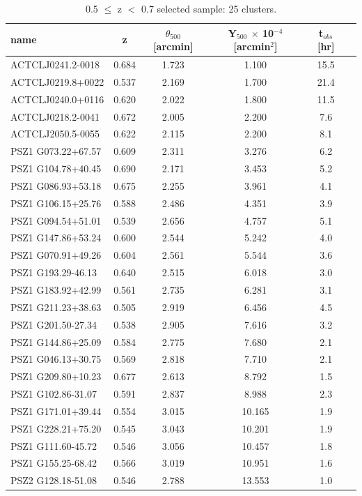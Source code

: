 \documentclass[11pt,a4paper,twoside,graphicx,color]{article}
\begin{document}
\begin{table}
\centering
\begin{tabular}{|l  || c  | c | c | c | c | }
  \hline                       
name  &   z  & $\theta_{500}$ [arcmin] & Y$_{500}$ $\times$ 10$^{-4}$ [arcmin$^{2}$] & t$_{obs}$ [hr] \\ \hline
   ACTCLJ0241.2-0018  & 0.684 & 1.723 & 1.100 & 15.5 \\ \hline
   ACTCLJ0219.8+0022  & 0.537 & 2.169 & 1.700 & 21.4 \\ \hline
   ACTCLJ0240.0+0116  & 0.620 & 2.022 & 1.800 & 11.5 \\ \hline
   ACTCLJ0218.2-0041  & 0.672 & 2.005 & 2.200 & 7.6 \\ \hline
   ACTCLJ2050.5-0055  & 0.622 & 2.115 & 2.200 & 8.1 \\ \hline
  PSZ1 G073.22+67.57  & 0.609 & 2.311 & 3.276 & 6.2 \\ \hline
  PSZ1 G104.78+40.45  & 0.690 & 2.171 & 3.453 & 5.2 \\ \hline
  PSZ1 G086.93+53.18  & 0.675 & 2.255 & 3.961 & 4.1 \\ \hline
  PSZ1 G106.15+25.76  & 0.588 & 2.486 & 4.351 & 3.9 \\ \hline
  PSZ1 G094.54+51.01  & 0.539 & 2.656 & 4.757 & 5.1 \\ \hline
  PSZ1 G147.86+53.24  & 0.600 & 2.544 & 5.242 & 4.0 \\ \hline
  PSZ1 G070.91+49.26  & 0.604 & 2.561 & 5.544 & 3.6 \\ \hline
  PSZ1 G193.29-46.13  & 0.640 & 2.515 & 6.018 & 3.0 \\ \hline
  PSZ1 G183.92+42.99  & 0.561 & 2.735 & 6.281 & 3.1 \\ \hline
  PSZ1 G211.23+38.63  & 0.505 & 2.919 & 6.456 & 4.5 \\ \hline
  PSZ1 G201.50-27.34  & 0.538 & 2.905 & 7.616 & 3.2 \\ \hline
  PSZ1 G144.86+25.09  & 0.584 & 2.775 & 7.680 & 2.1 \\ \hline
  PSZ1 G046.13+30.75  & 0.569 & 2.818 & 7.710 & 2.1 \\ \hline
  PSZ1 G209.80+10.23  & 0.677 & 2.613 & 8.792 & 1.5 \\ \hline
  PSZ1 G102.86-31.07  & 0.591 & 2.837 & 8.988 & 2.3 \\ \hline
  PSZ1 G171.01+39.44  & 0.554 & 3.015 & 10.165 & 1.9 \\ \hline 
  PSZ1 G228.21+75.20  & 0.545 & 3.043 & 10.201 & 1.9 \\ \hline
  PSZ1 G111.60-45.72  & 0.546 & 3.056 & 10.457 & 1.8 \\ \hline
  PSZ1 G155.25-68.42  & 0.566 & 3.019 & 10.951 & 1.6 \\ \hline
  PSZ2 G128.18-51.08  & 0.546 & 2.788 & 13.553 & 1.0 \\ \hline
\end{tabular}
 \caption{{\small 0.5 $\leq$ z $<$ 0.7 selected sample: 25 clusters.}}
\label{tab:z1_selected_sample}
\end{table}
\end{document}
